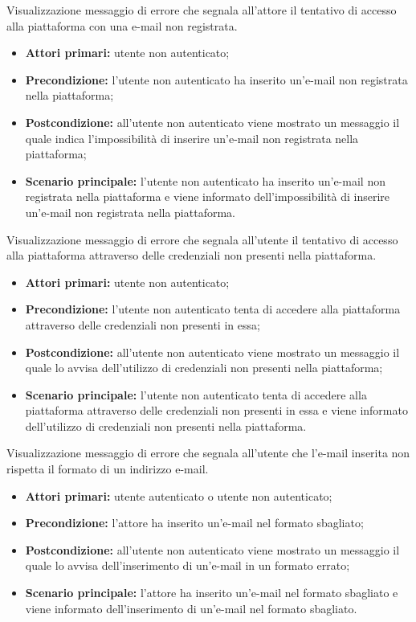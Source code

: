 Visualizzazione messaggio di errore che segnala all'attore il tentativo di accesso alla piattaforma con una e-mail non registrata.
\begin{itemize}
    \item \textbf{Attori primari:} utente non autenticato;
    \item \textbf{Precondizione:} l'utente non autenticato ha inserito un'e-mail non registrata nella piattaforma;
    \item \textbf{Postcondizione:} all'utente non autenticato viene mostrato un messaggio il quale indica l'impossibilità di inserire un'e-mail non registrata nella piattaforma;
    \item \textbf{Scenario principale:} l'utente non autenticato ha inserito un'e-mail non registrata nella piattaforma e viene informato dell'impossibilità di inserire un'e-mail non registrata nella piattaforma.
\end{itemize}

Visualizzazione messaggio di errore che segnala all'utente il tentativo di accesso alla piattaforma attraverso delle credenziali non presenti nella piattaforma.
\begin{itemize}
    \item \textbf{Attori primari:} utente non autenticato;
    \item \textbf{Precondizione:} l'utente non autenticato tenta di accedere alla piattaforma attraverso delle credenziali non presenti in essa;
    \item \textbf{Postcondizione:} all'utente non autenticato viene mostrato un messaggio il quale lo avvisa dell'utilizzo di credenziali non presenti nella piattaforma;
    \item \textbf{Scenario principale:} l'utente non autenticato tenta di accedere alla piattaforma attraverso delle credenziali non presenti in essa e viene informato dell'utilizzo di credenziali non presenti nella piattaforma.
\end{itemize}

Visualizzazione messaggio di errore che segnala all'utente che l'e-mail inserita non rispetta il formato di un indirizzo e-mail.
\begin{itemize}
    \item \textbf{Attori primari:} utente autenticato o utente non autenticato;
    \item \textbf{Precondizione:} l'attore ha inserito un'e-mail nel formato sbagliato;
    \item \textbf{Postcondizione:} all'utente non autenticato viene mostrato un messaggio il quale lo avvisa dell'inserimento di un'e-mail in un formato errato;
    \item \textbf{Scenario principale:} l'attore ha inserito un'e-mail nel formato sbagliato e viene informato dell'inserimento di un'e-mail nel formato sbagliato.
\end{itemize}

